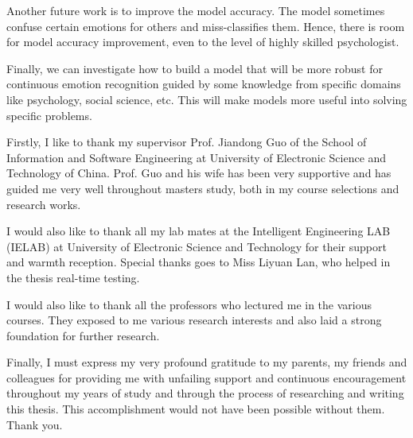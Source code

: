 \documentclass[master]{thesis-uestc}
\begin{document}
Another future work is to improve the model accuracy. The model sometimes confuse certain emotions for others and miss-classifies them. Hence, there is room for model accuracy improvement, even to the level of highly skilled psychologist.

Finally, we can investigate how to build a model that will be more robust for continuous emotion recognition guided by some knowledge from specific domains like psychology, social science, etc. This will make models more useful into solving specific problems.

\thesisacknowledgement
Firstly, I like to thank my supervisor Prof. Jiandong Guo of the School of Information and Software Engineering at University of Electronic Science and Technology of China. Prof. Guo and his wife has been very supportive and has guided me very well throughout masters study, both in my course selections and research works.

I would also like to thank all my lab mates at the Intelligent Engineering LAB (IELAB) at University of Electronic Science and Technology for their support and warmth reception. Special thanks goes to Miss Liyuan Lan, who helped in the thesis real-time testing.

I would also like to thank all the professors who lectured me in the various courses. They exposed to me various research interests and also laid a strong foundation for further research.

Finally, I must express my very profound gratitude to my parents, my friends and colleagues for providing me with unfailing support and continuous encouragement throughout my years of study and through the process of researching and writing this thesis. This accomplishment would not have been possible without them. Thank you.


%
% 
%


%

\end{document}
